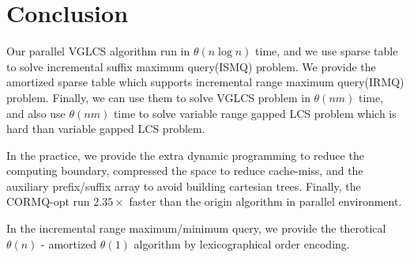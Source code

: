 \section{Conclusion}
\label{sec:Conclusion}

Our parallel VGLCS algorithm run in $\theta(n \log n)$ time, and we
use sparse table to solve incremental suffix maximum query(ISMQ)
problem.  We provide the amortized sparse table which supports
incremental range maximum query(IRMQ) problem.  Finally, we can use
them to solve VGLCS problem in $\theta(nm)$ time, and also use
$\theta(nm)$ time to solve variable range gapped LCS problem which is
hard than variable gapped LCS problem.

In the practice, we provide the extra dynamic programming to reduce
the computing boundary, compressed the space to reduce cache-miss, and
the auxiliary prefix/suffix array to avoid building cartesian trees.
Finally, the CORMQ-opt run $2.35 \times$ faster than the origin
algorithm in parallel environment.

In the incremental range maximum/minimum query, we provide the
therotical $\theta(n)$ - amortized $\theta(1)$ algorithm by
lexicographical order encoding.